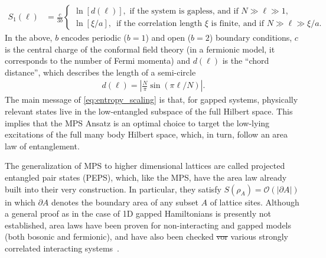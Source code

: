 \documentclass{svmono}
\providecommand{\DIFaddtex}[1]{{\protect\color{blue}\uwave{#1}}} %
\providecommand{\DIFdeltex}[1]{{\protect\color{red}\sout{#1}}}                      %
\providecommand{\DIFaddbegin}{} %
\providecommand{\DIFaddend}{} %
\providecommand{\DIFdelbegin}{} %
\providecommand{\DIFdelend}{} %
\providecommand{\DIFadd}[1]{\texorpdfstring{\DIFaddtex{#1}}{#1}} %
\providecommand{\DIFdel}[1]{\texorpdfstring{\DIFdeltex{#1}}{}} %
\newcommand{\DIFscaledelfig}{0.5}
\newlength{\DIFdelgraphicswidth} %
\newlength{\DIFdelgraphicsheight} %
\newcommand{\DIFaddincludegraphics}[2][]{{\color{blue}\fbox{\DIFOincludegraphics[#1]{#2}}}} %
\newcommand{\DIFdelincludegraphics}[2][]{%
\sbox{\DIFdelgraphicsbox}{\DIFOincludegraphics[#1]{#2}}%
\settoboxwidth{\DIFdelgraphicswidth}{\DIFdelgraphicsbox} %
\settoboxtotalheight{\DIFdelgraphicsheight}{\DIFdelgraphicsbox} %
\scalebox{\DIFscaledelfig}{%
\parbox[b]{\DIFdelgraphicswidth}{\usebox{\DIFdelgraphicsbox}\\[-\baselineskip] \rule{\DIFdelgraphicswidth}{0em}}\llap{\resizebox{\DIFdelgraphicswidth}{\DIFdelgraphicsheight}{%
\setlength{\unitlength}{\DIFdelgraphicswidth}%
\begin{picture}(1,1)%
\thicklines\linethickness{2pt} %
{\color[rgb]{1,0,0}\put(0,0){\framebox(1,1){}}}%
{\color[rgb]{1,0,0}\put(0,0){\line( 1,1){1}}}%
{\color[rgb]{1,0,0}\put(0,1){\line(1,-1){1}}}%
\end{picture}%
}\hspace*{3pt}}} %
} %
\DeclareRobustCommand{\DIFaddbegin}{\DIFOaddbegin \let\includegraphics\DIFaddincludegraphics} %
\DeclareRobustCommand{\DIFaddend}{\DIFOaddend \let\includegraphics\DIFOincludegraphics} %
\DeclareRobustCommand{\DIFdelbegin}{\DIFOdelbegin \let\includegraphics\DIFdelincludegraphics} %
\DeclareRobustCommand{\DIFdelend}{\DIFOaddend \let\includegraphics\DIFOincludegraphics} %
\begin{document}
\DIFdelend \DIFaddbegin \begin{align}
    S_1(\ell) &=
    \frac c{3b}
    \left\{
    \begin{array}{l}
        \ln[d(\ell)],\text{ if the system is gapless, and if $N\gg\ell\gg 1$,}\\[0.25cm]
        \ln[\xi/a],\,\text{ if the correlation length $\xi$ is finite, and if $N\gg\ell\gg\xi/a$.}
    \end{array}
    \right.
    \label{eq:entropy_scaling}
\end{align}\DIFaddend 
In the above, $b$ encodes periodic ($b=1$) and open ($b=2$) boundary conditions, $c$ is the central charge of the conformal field theory (in a fermionic model, it corresponds to the number of Fermi momenta) and $d(\ell)$ is the ``chord distance'', which describes the length of a semi-circle
\begin{align}
    d(\ell) = \left|\frac{N}{\pi}\sin(\pi\ell/N)\right|.
\end{align}
The main message of \cref{eq:entropy_scaling} is that, for gapped systems, physically relevant states live in the low-entangled subspace of the full Hilbert space.
This implies that the MPS Ansatz is an optimal choice to target the low-lying excitations of the full many body Hilbert space, which, in turn, follow an area law of entanglement.

The generalization of MPS to higher dimensional lattices are called projected entangled pair states (PEPS), which, like the MPS, have the area law already built into their very construction.
In particular, they satisfy $S(\rho_A)=\mathcal O(|\partial A|)$ in which $\partial A$ denotes the boundary area of any subset $A$ of lattice sites.
Although a general proof as in the case of 1D gapped Hamiltonians is presently not established, area laws have been proven for non-interacting and gapped models (both bosonic and fermionic), and have also been checked \DIFdelbegin \DIFdel{vor }\DIFdelend \DIFaddbegin \DIFadd{for }\DIFaddend various strongly correlated interacting systems~\cite{Eisert2010,Laflorencie2016}.
\end{document}
